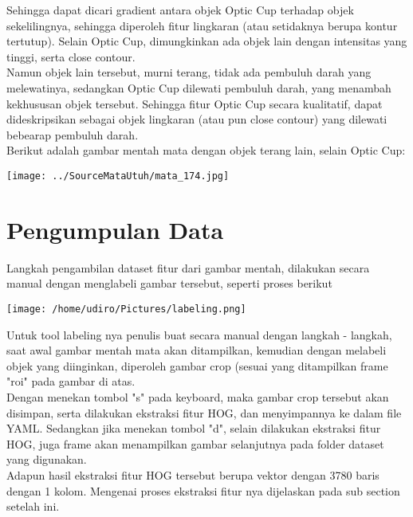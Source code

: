\documentclass[]{IEEEphot}
\begin{document}
\noindent Sehingga dapat dicari gradient antara objek Optic Cup terhadap objek sekelilingnya, sehingga diperoleh fitur lingkaran (atau setidaknya berupa kontur tertutup). Selain Optic Cup, dimungkinkan ada objek lain dengan intensitas yang tinggi, serta close contour. \\

\noindent Namun objek lain tersebut, murni terang, tidak ada pembuluh darah yang melewatinya, sedangkan Optic Cup dilewati pembuluh darah, yang menambah kekhususan objek tersebut. Sehingga fitur Optic Cup secara kualitatif, dapat dideskripsikan sebagai objek lingkaran (atau pun close contour) yang dilewati bebearap pembuluh darah.\\

\noindent Berikut adalah gambar mentah mata dengan objek terang lain, selain Optic Cup:\\

\begin{center}
\texttt{[image: ../SourceMataUtuh/mata\_174.jpg]}
\end{center}

\section{Pengumpulan Data}
Langkah pengambilan dataset fitur dari gambar mentah, dilakukan secara manual dengan menglabeli gambar tersebut, seperti proses berikut
\begin{center}
\texttt{[image: /home/udiro/Pictures/labeling.png]}
\end{center}

\noindent Untuk tool labeling nya penulis buat secara manual dengan langkah - langkah, saat awal gambar mentah mata akan ditampilkan, kemudian dengan melabeli objek yang diinginkan, diperoleh gambar crop (sesuai yang ditampilkan frame "roi" pada gambar di atas.\\

\noindent Dengan menekan tombol "s" pada keyboard, maka gambar crop tersebut akan disimpan, serta dilakukan ekstraksi fitur HOG, dan menyimpannya ke dalam file YAML. Sedangkan jika menekan tombol "d", selain dilakukan ekstraksi fitur HOG, juga frame akan menampilkan gambar selanjutnya pada folder dataset yang  digunakan.\\

\noindent Adapun hasil ekstraksi fitur HOG tersebut berupa vektor dengan 3780 baris dengan 1 kolom. Mengenai proses ekstraksi fitur nya dijelaskan pada sub section setelah ini.\\
\end{document}
